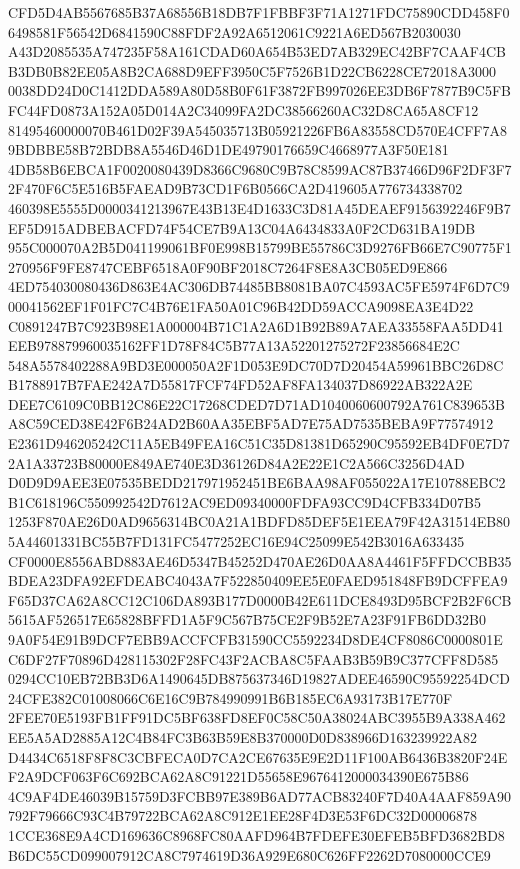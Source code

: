 \documentclass[UTF8,fontset=fandol,zihao=-4,a4paper]{ctexart}
\begin{document}
{{CFD5D4AB5567685B37A68556B18DB7F1FBBF3F71A1271FDC75890CDD458F06498581F56542D6841590C88FDF2A92A6512061C9221A6ED567B2030030
A43D2085535A747235F58A161CDAD60A654B53ED7AB329EC42BF7CAAF4CBB3DB0B82EE05A8B2CA688D9EFF3950C5F7526B1D22CB6228CE72018A3000
0038DD24D0C1412DDA589A80D58B0F61F3872FB997026EE3DB6F7877B9C5FBFC44FD0873A152A05D014A2C34099FA2DC38566260AC32D8CA65A8CF12
81495460000070B461D02F39A545035713B05921226FB6A83558CD570E4CFF7A89BDBBE58B72BDB8A5546D46D1DE49790176659C4668977A3F50E181
4DB58B6EBCA1F0020080439D8366C9680C9B78C8599AC87B37466D96F2DF3F72F470F6C5E516B5FAEAD9B73CD1F6B0566CA2D419605A776734338702
460398E5555D0000341213967E43B13E4D1633C3D81A45DEAEF9156392246F9B7EF5D915ADBEBACFD74F54CE7B9A13C04A6434833A0F2CD631BA19DB
955C000070A2B5D041199061BF0E998B15799BE55786C3D9276FB66E7C90775F1270956F9FE8747CEBF6518A0F90BF2018C7264F8E8A3CB05ED9E866
4ED754030080436D863E4AC306DB74485BB8081BA07C4593AC5FE5974F6D7C900041562EF1F01FC7C4B76E1FA50A01C96B42DD59ACCA9098EA3E4D22
C0891247B7C923B98E1A000004B71C1A2A6D1B92B89A7AEA33558FAA5DD41EEB978879960035162FF1D78F84C5B77A13A52201275272F23856684E2C
548A5578402288A9BD3E000050A2F1D053E9DC70D7D20454A59961BBC26D8CB1788917B7FAE242A7D55817FCF74FD52AF8FA134037D86922AB322A2E
DEE7C6109C0BB12C86E22C17268CDED7D71AD1040060600792A761C839653BA8C59CED38E42F6B24AD2B60AA35EBF5AD7E75AD7535BEBA9F77574912
E2361D946205242C11A5EB49FEA16C51C35D81381D65290C95592EB4DF0E7D72A1A33723B80000E849AE740E3D36126D84A2E22E1C2A566C3256D4AD
D0D9D9AEE3E07535BEDD217971952451BE6BAA98AF055022A17E10788EBC2B1C618196C550992542D7612AC9ED09340000FDFA93CC9D4CFB334D07B5
1253F870AE26D0AD9656314BC0A21A1BDFD85DEF5E1EEA79F42A31514EB805A44601331BC55B7FD131FC5477252EC16E94C25099E542B3016A633435
CF0000E8556ABD883AE46D5347B45252D470AE26D0AA8A4461F5FFDCCBB35BDEA23DFA92EFDEABC4043A7F522850409EE5E0FAED951848FB9DCFFEA9
F65D37CA62A8CC12C106DA893B177D0000B42E611DCE8493D95BCF2B2F6CB5615AF526517E65828BFFD1A5F9C567B75CE2F9B52E7A23F91FB6DD32B0
9A0F54E91B9DCF7EBB9ACCFCFB31590CC5592234D8DE4CF8086C0000801EC6DF27F70896D428115302F28FC43F2ACBA8C5FAAB3B59B9C377CFF8D585
0294CC10EB72BB3D6A1490645DB875637346D19827ADEE46590C95592254DCD24CFE382C01008066C6E16C9B784990991B6B185EC6A93173B17E770F
2FEE70E5193FB1FF91DC5BF638FD8EF0C58C50A38024ABC3955B9A338A462EE5A5AD2885A12C4B84FC3B63B59E8B370000D0D838966D163239922A82
D4434C6518F8F8C3CBFECA0D7CA2CE67635E9E2D11F100AB6436B3820F24EF2A9DCF063F6C692BCA62A8C91221D55658E9676412000034390E675B86
4C9AF4DE46039B15759D3FCBB97E389B6AD77ACB83240F7D40A4AAF859A90792F79666C93C4B79722BCA62A8C912E1EE28F4D3E53F6DC32D00006878
1CCE368E9A4CD169636C8968FC80AAFD964B7FDEFE30EFEB5BFD3682BD8B6DC55CD099007912CA8C7974619D36A929E680C626FF2262D7080000CCE9
}}
\end{document}
